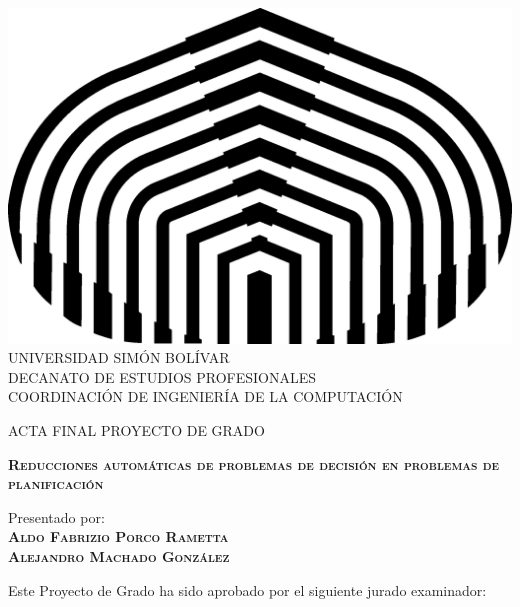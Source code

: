 \documentclass[oneside,12pt,letterpaper]{report}
\begin{document}
\begin{titlepage}
\begin{center}

\includegraphics[scale=0.5,type=png,ext=.png,read=.png]{figuras/usb} \\

\textsc {\large UNIVERSIDAD SIMÓN BOLÍVAR} \\
\textsc{DECANATO DE ESTUDIOS PROFESIONALES\\
COORDINACIÓN DE INGENIERÍA DE LA COMPUTACIÓN}

\bigskip
\bigskip
\bigskip
\bigskip
\bigskip
\bigskip

\textsc{ACTA FINAL PROYECTO DE GRADO}

\bigskip
\bigskip

\textsc{\bfseries Reducciones automáticas de problemas de decisión en problemas de
planificación}

\bigskip
\bigskip
\bigskip
\bigskip

\begin{minipage}{\textwidth}
\centering
Presentado por: \\
\textsc{\bfseries Aldo Fabrizio Porco Rametta} \\
\textsc{\bfseries Alejandro Machado González} \\

\bigskip
\bigskip
\bigskip

Este Proyecto de Grado ha sido aprobado por el siguiente jurado examinador: \\

\bigskip
\bigskip


\end{minipage}
\end{center}
\end{titlepage}
\end{document}
